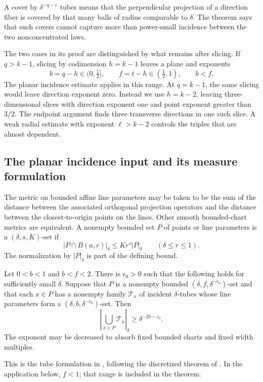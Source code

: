 A cover by $\delta^{-q-\epsilon}$ tubes means that the perpendicular
projection of a direction fiber is covered by that many balls of radius
comparable to $\delta$. The theorem says that such covers cannot capture
more than power-small incidence between the two nonconcentrated laws.

The two cases in its proof are distinguished by what remains after
slicing. If $q>k-1$, slicing by codimension $h=k-1$ leaves a plane and
exponents
\[
 b=q-h\in(0,\tfrac12],\qquad f=t-h\in(\tfrac12,1),\qquad b<f.
\]
The planar incidence estimate applies in this range. At $q=k-1$, the
same slicing would leave direction exponent zero. Instead we use
$h=k-2$, leaving three-dimensional slices with direction exponent one
and point exponent greater than $3/2$. The endpoint argument finds three
transverse directions in one such slice. A weak radial estimate with
exponent $\ell>k-2$ controls the triples that are almost dependent.

\subsection{The planar incidence input and its measure formulation}

The metric on bounded affine line parameters may be taken to be the sum
of the distance between the associated orthogonal projection operators
and the distance between the closest-to-origin points on the lines.
Other smooth bounded-chart metrics are equivalent. A nonempty bounded
set $P$ of points or line parameters is a $(\delta,s,K)$-set if
\[
 |P\cap B(a,r)|_\delta\le K r^s |P|_\delta
       \qquad(\delta\le r\le1).
\]
The normalization by $|P|_\delta$ is part of the defining bound.

\begin{theorem}
\label{ang:furstenberg}
Let $0<b<1$ and $b<f<2$. There is $\epsilon_0>0$ such that the
following holds for sufficiently small $\delta$. Suppose that $P$ is
a nonempty bounded $(\delta,f,\delta^{-\epsilon_0})$-set and that
each $x\in P$ has a nonempty family $\mathcal T_x$ of incident
$\delta$-tubes whose line parameters form a
$(\delta,b,\delta^{-\epsilon_0})$-set. Then
\[
 \left|\bigcup_{x\in P}\mathcal T_x\right|_\delta
       \ge\delta^{-2b-\epsilon_0}.
\]
The exponent may be decreased to absorb fixed bounded charts and fixed
width multiples.
\end{theorem}

This is the tube formulation in
\cite[Definitions~2.5--2.6 and Theorem~2.7]{OSW2024}, following the
discretized theorem of \cite[Theorem~1.3]{OS2023}. In the application
below, $f<1$; that range is included in the theorem.

